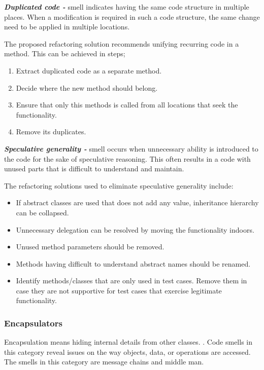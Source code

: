 \textit{\textbf{Duplicated code -}} smell indicates having the same code structure in multiple places. When a modification is required in such a code structure, the same change need to be applied in multiple locations.

The proposed refactoring solution recommends unifying recurring code in a method. This can be achieved in steps; 
\begin{enumerate}
\item Extract duplicated code as a separate method.
\item Decide where the new method should belong.
\item Ensure that only this methods is called from all locations that seek the functionality.
\item Remove its duplicates.
\end{enumerate}

\textit{\textbf{Speculative generality -}} smell occurs when unnecessary ability is introduced to the code for the sake of speculative reasoning. This often results in a code with unused parts that is difficult to understand and maintain. 

The refactoring solutions used to eliminate speculative generality include:

\begin{itemize}
\item If abstract classes are used that does not add any value, inheritance hierarchy can be collapsed.
\item Unnecessary delegation can be resolved by moving the functionality indoors.
\item Unused method parameters should be removed.
\item Methods having difficult to understand abstract names should be renamed.
\item Identify methods/classes that are only used in test cases. Remove them in case they are not supportive for test cases that exercise legitimate functionality. 
\end{itemize}

\subsubsection*{Encapsulators}
Encapsulation means hiding internal details from other classes. \cite{fowlerRefactor}. Code smells in this category reveal issues on the way objects, data, or operations are accessed. The smells in this category are message chains and middle man. 

